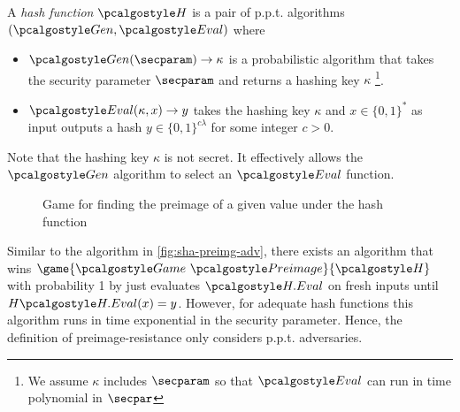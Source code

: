 \begin{definition}
  A \emph{hash function} $\algo{H}$ is a pair of p.p.t. algorithms $(\algo{Gen}, \algo{Eval})$ where
  \begin{itemize}
  \item $\algo{Gen}(\secparam) \rightarrow \kappa$ is a probabilistic algorithm that takes the security parameter $\secparam$ and returns a hashing key $\kappa$ \footnote{We assume $\kappa$ includes $\secparam$ so that $\algo{Eval}$ can run in time polynomial in $\secpar$}.
  \item $\algo{Eval}(\kappa, x) \rightarrow y$ takes the hashing key $\kappa$ and $x\in \{0,1\}^*$ as input outputs a hash $y\in \{0,1\}^{c\lambda}$ for some integer $c > 0$.
  \end{itemize}
\end{definition}

Note that the hashing key $\kappa$ is not secret.
It effectively allows the $\algo{Gen}$ algorithm to select an $\algo{Eval}$ function.

\begin{figure}[tbhp]
  \begin{center}
    \begin{tcolorbox}[width=5cm]
      \begin{pchstack}[center]
      \end{pchstack}
    \end{tcolorbox}
  \end{center}
  \caption{Game for finding the preimage of a given value under the hash function \label{fig:break-hash}}
\end{figure}

Similar to the algorithm in \autoref{fig:sha-preimg-adv}, there exists an algorithm that wins $\game{\Game~\algo{Preimage}}{\algo{H}}$ with probability 1 by just evaluates $\algo{H.Eval}$ on fresh inputs until $H\algo{H.Eval}(x) = y$.
However, for adequate hash functions this algorithm runs in time exponential in the security parameter.
Hence, the definition of preimage-resistance only considers p.p.t. adversaries.


